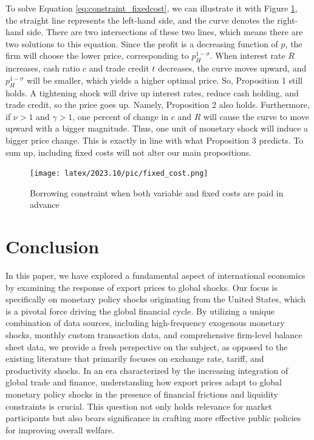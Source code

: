 To solve Equation \ref{eq:constraint_fixedcost}, we can illustrate it with Figure \ref{fig: fixed_cost}, the straight line represents the left-hand side, and the curve denotes the right-hand side. There are two intersections of these two lines, which means there are two solutions to this equation. Since the profit is a decreasing function of $p$, the firm will choose the lower price, corresponding to $p_H^{1-\sigma}$. When interest rate $R$ increases, cash ratio $c$ and trade credit $t$ decreases, the curve moves upward, and $p_H^{1-\sigma}$ will be smaller, which yields a higher optimal price. So, Proposition 1 still holds. A tightening shock will drive up interest rates, reduce cash holding, and trade credit, so the price goes up. Namely, Proposition 2 also holds. Furthermore, if $\nu>1$ and $\gamma>1$, one percent of change in $c$ and $R$ will cause the curve to move upward with a bigger magnitude. Thus, one unit of monetary shock will induce a bigger price change. This is exactly in line with what Proposition 3 predicts. To sum up, including fixed costs will not alter our main propositions.

\begin{figure}[H]
     \centering
         \texttt{[image: latex/2023.10/pic/fixed\_cost.png]}
         \caption{\small Borrowing constraint when both variable and fixed costs are paid in advance}
         \label{fig: fixed_cost}
\end{figure}



\section{Conclusion}

In this paper, we have explored a fundamental aspect of international economics by examining the response of export prices to global shocks. Our focus is specifically on monetary policy shocks originating from the United States, which is a pivotal force driving the global financial cycle. By utilizing a unique combination of data sources, including high-frequency exogenous monetary shocks, monthly custom transaction data, and comprehensive firm-level balance sheet data, we provide a fresh perspective on the subject, as opposed to the existing literature that primarily focuses on exchange rate, tariff, and productivity shocks. In an era characterized by the increasing integration of global trade and finance, understanding how export prices adapt to global monetary policy shocks in the presence of financial frictions and liquidity constraints is crucial. This question not only holds relevance for market participants but also bears significance in crafting more effective public policies for improving overall welfare.

